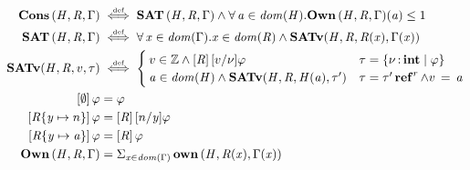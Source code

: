 \begin{figure}
\begin{align*}
   \end{align*}
   \begin{align*}
    \ottkw{Cons} \, \ottsym{(}  \ottnt{H}  \ottsym{,}  \ottnt{R}  \ottsym{,}  \Gamma  \ottsym{)} & \stackrel{\textrm{\tiny def}}{\iff} \ottkw{SAT} \, \ottsym{(}  \ottnt{H}  \ottsym{,}  \ottnt{R}  \ottsym{,}  \Gamma  \ottsym{)} \wedge \forall \,  \ottmv{a}  \in \DOM( \ottnt{H} )   \ottsym{.}  \ottkw{Own} \, \ottsym{(}  \ottnt{H}  \ottsym{,}  \ottnt{R}  \ottsym{,}  \Gamma  \ottsym{)}  \ottsym{(}  \ottmv{a}  \ottsym{)} \leq 1 \\
    \ottkw{SAT} \, \ottsym{(}  \ottnt{H}  \ottsym{,}  \ottnt{R}  \ottsym{,}  \Gamma  \ottsym{)} & \stackrel{\textrm{\tiny def}}{\iff} \forall \,  \mathit{x}  \in \DOM( \Gamma )   \ottsym{.}   \mathit{x}  \in \DOM( \ottnt{R} )   \wedge   \ottkw{SATv} ( \ottnt{H} , \ottnt{R} , \ottnt{R}  \ottsym{(}  \mathit{x}  \ottsym{)} , \Gamma  \ottsym{(}  \mathit{x}  \ottsym{)} )  \\
     \ottkw{SATv} ( \ottnt{H} , \ottnt{R} , v , \tau )  & \stackrel{\textrm{\tiny def}}{\iff} \begin{cases}
       v  \in  \mathbb{Z}   \wedge  \ottsym{[}  \ottnt{R}  \ottsym{]} \, \ottsym{[}  v  \ottsym{/}  \nu  \ottsym{]}  \varphi & \tau  \ottsym{=}   \set{  \nu  \COL \TINT \mid  \varphi }  \\
       \ottmv{a}  \in \DOM( \ottnt{H} )   \wedge   \ottkw{SATv} ( \ottnt{H} , \ottnt{R} , \ottnt{H}  \ottsym{(}  \ottmv{a}  \ottsym{)} , \tau' )  & \tau  \ottsym{=}   \tau'  \TREF^{ r }   \wedge  v \, \ottsym{=} \, \ottmv{a}
    \end{cases} \\
    \ottsym{[}   \emptyset   \ottsym{]} \, \varphi & = \varphi \\
    \ottsym{[}  \ottnt{R}  \ottsym{\{}  \mathit{y}  \mapsto  n  \ottsym{\}}  \ottsym{]} \, \varphi & =  \ottsym{[}  \ottnt{R}  \ottsym{]} \, \ottsym{[}  n  \ottsym{/}  \mathit{y}  \ottsym{]}  \varphi \\
    \ottsym{[}  \ottnt{R}  \ottsym{\{}  \mathit{y}  \mapsto  \ottmv{a}  \ottsym{\}}  \ottsym{]} \, \varphi & =  \ottsym{[}  \ottnt{R}  \ottsym{]} \, \varphi \\
    \ottkw{Own} \, \ottsym{(}  \ottnt{H}  \ottsym{,}  \ottnt{R}  \ottsym{,}  \Gamma  \ottsym{)} & =    \Sigma _{ \mathit{x} \in  \DOM( \Gamma )  }\, \ottkw{own} \, \ottsym{(}  \ottnt{H}  \ottsym{,}  \ottnt{R}  \ottsym{(}  \mathit{x}  \ottsym{)}  \ottsym{,}  \Gamma  \ottsym{(}  \mathit{x}  \ottsym{)}  \ottsym{)}  \\

\end{align*}
\end{figure}
